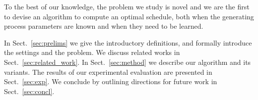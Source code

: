 To the best of our knowledge, the problem we study is novel and we are the first
to devise an algorithm to compute an optimal schedule, both when the generating
process parameters are known and when they need to be learned. 

 In Sect.~\ref{sec:prelims} we give the introductory
definitions, and formally introduce the settings and the problem. We discuss
related works in Sect.~\ref{sec:related_work}. In Sect.~\ref{sec:method} we
describe our algorithm \algoname and its variants. The results of our
experimental evaluation are presented in Sect.~\ref{sec:exp}. We conclude by
outlining directions for future work in Sect.~\ref{sec:concl}.
